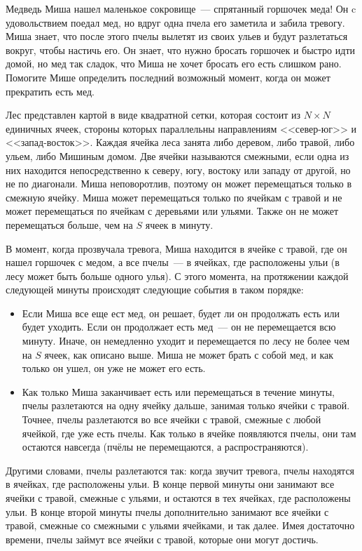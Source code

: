 Медведь Миша нашел маленькое сокровище~--- спрятанный горшочек меда! Он c удовольствием
поедал мед, но вдруг одна пчела его заметила и забила тревогу. Миша знает, что после этого пчелы вылетят из своих ульев и будут разлетаться вокруг, чтобы настичь его. Он знает, что нужно бросать горшочек и быстро идти домой, но мед так сладок, что Миша не хочет бросать его есть слишком рано. Помогите Мише определить последний возможный момент, когда он может прекратить есть мед.

Лес представлен картой в виде квадратной сетки, которая состоит из $N \times N$ единичных ячеек, стороны которых параллельны направлениям <<север-юг>> и <<запад-восток>>. Каждая ячейка леса занята либо деревом, либо травой, либо ульем, либо Мишиным домом. Две ячейки называются смежными, если одна из них находится непосредственно к северу, югу, востоку или западу от другой, но не по диагонали. Миша неповоротлив, поэтому он может перемещаться только в смежную ячейку. Миша может перемещаться только по ячейкам с травой и не может перемещаться по ячейкам с деревьями или ульями. Также он не может перемещаться больше, чем на $S$ ячеек в минуту.

В момент, когда прозвучала тревога, Миша находится в ячейке с травой, где он нашел горшочек с медом, а все пчелы~--- в ячейках, где расположены ульи (в лесу может быть больше одного улья). С этого момента, на протяжении каждой следующей минуты происходят следующие события в таком порядке: 

\begin{itemize}
\item Если Миша все еще ест мед, он решает, будет ли он продолжать есть или будет уходить. Если он продолжает есть мед~--- он не перемещается всю минуту. Иначе, он немедленно уходит и перемещается по лесу не более чем на $S$ ячеек, как описано выше. Миша не может брать с собой мед, и как только он ушел, он уже не может его есть.
\item Как только Миша заканчивает есть или перемещаться в течение минуты, пчелы разлетаются на одну ячейку дальше, занимая только ячейки с травой. Точнее, пчелы разлетаются во все ячейки с травой, смежные с любой ячейкой, где уже есть пчелы. Как только в ячейке появляются пчелы, они там остаются навсегда (пчёлы не перемещаются, а
распространяются).
\end{itemize}

Другими словами, пчелы разлетаются так: когда звучит тревога, пчелы находятся в ячейках, где расположены ульи. В конце первой минуты они занимают все ячейки с травой, смежные с ульями, и остаются в тех ячейках, где расположены ульи. В конце второй минуты пчелы дополнительно занимают все ячейки с травой, смежные со смежными с ульями ячейками, и так далее. Имея достаточно времени, пчелы займут все ячейки с травой, которые они могут достичь. 


